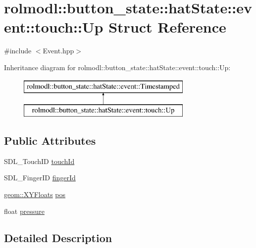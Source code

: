 \hypertarget{structrolmodl_1_1button__state_1_1hat_state_1_1event_1_1touch_1_1_up}{}\section{rolmodl\+::button\+\_\+state\+::hat\+State\+::event\+::touch\+::Up Struct Reference}
\label{structrolmodl_1_1button__state_1_1hat_state_1_1event_1_1touch_1_1_up}


{\ttfamily \#include $<$Event.\+hpp$>$}

Inheritance diagram for rolmodl\+::button\+\_\+state\+::hat\+State\+::event\+::touch\+::Up\+:\begin{figure}[H]
\begin{center}
\leavevmode
\includegraphics[height=2.000000cm]{structrolmodl_1_1button__state_1_1hat_state_1_1event_1_1touch_1_1_up}
\end{center}
\end{figure}
\subsection*{Public Attributes}
\begin{DoxyCompactItemize}
\item 
S\+D\+L\+\_\+\+Touch\+ID \mbox{\hyperlink{structrolmodl_1_1button__state_1_1hat_state_1_1event_1_1touch_1_1_up_aa0d0efa35158cf55824c8da292e9f3f7}{touch\+Id}}
\item 
S\+D\+L\+\_\+\+Finger\+ID \mbox{\hyperlink{structrolmodl_1_1button__state_1_1hat_state_1_1event_1_1touch_1_1_up_a7a703147bb31c1187964f60289fe9e71}{finger\+Id}}
\item 
\mbox{\hyperlink{structrolmodl_1_1geom_1_1_x_y_floats}{geom\+::\+X\+Y\+Floats}} \mbox{\hyperlink{structrolmodl_1_1button__state_1_1hat_state_1_1event_1_1touch_1_1_up_a6c4cc3a92d751b67a0f7f9740023246e}{pos}}
\item 
float \mbox{\hyperlink{structrolmodl_1_1button__state_1_1hat_state_1_1event_1_1touch_1_1_up_a1807fde907ff65a217d64bb9eccff424}{pressure}}
\end{DoxyCompactItemize}


\subsection{Detailed Description}


